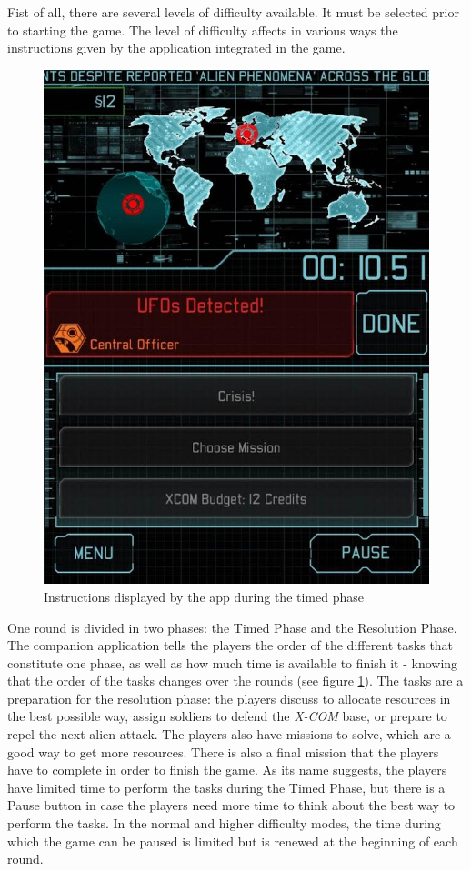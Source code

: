 Fist of all, there are several levels of difficulty available. It must be selected prior to starting the game. The level of difficulty affects in various ways the instructions given by the application integrated in the game.

\begin{figure}[!ht]
    \centering
    \includegraphics[scale=0.3]{Images/xcom_boardgame_app.jpg}
    \caption{Instructions displayed by the app during the timed phase}
    \label{fig:XCOMAPP}
\end{figure}


One round is divided in two phases: the Timed Phase and the Resolution Phase. The companion application tells the players the order of the different tasks that constitute one phase, as well as how much time is available to finish it - knowing that the order of the tasks changes over the rounds (see figure \ref{fig:XCOMAPP}). The tasks are a preparation for the resolution phase: the players discuss to allocate resources in the best possible way, assign soldiers to defend the \textit{X-COM} base, or prepare to repel the next alien attack. 
The players also have missions to solve, which are a good way to get more resources. There is also a final mission that the players have to complete in order to finish the game. As its name suggests, the players have limited time to perform the tasks during the Timed Phase, but there is a Pause button in case the players need more time to think about the best way to perform the tasks. In the normal and higher difficulty modes, the time during which the game can be paused is limited but is renewed at the beginning of each round.

